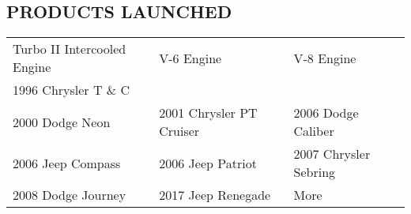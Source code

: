 \documentclass[line,margin]{res}
\begin{document}
\begin{resume}
\section{\textcolor{HeaderColor}{PRODUCTS LAUNCHED}}
		\begin{tabular}{ l l l }
		Turbo II Intercooled Engine & V-6 Engine & V-8 Engine \\
		1996 Chrysler T \& C &  & \\
		2000 Dodge Neon & 2001 Chrysler PT Cruiser & 2006 Dodge Caliber \\
		2006 Jeep Compass & 2006 Jeep Patriot & 2007 Chrysler Sebring \\
		2008 Dodge Journey & 2017 Jeep Renegade & More\\
		\end{tabular}
 
 

\end{resume}
\end{document}
